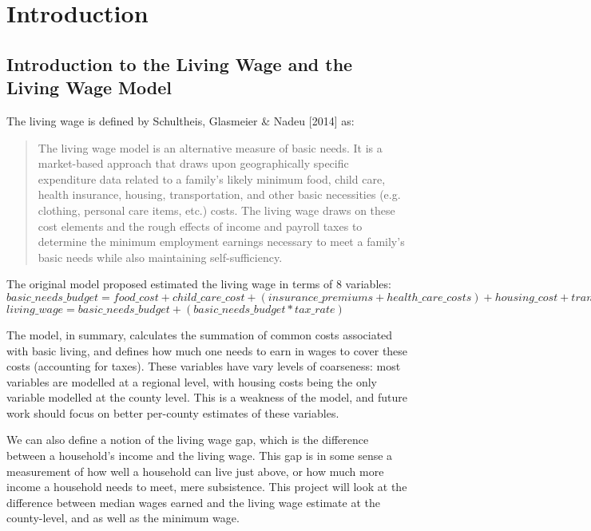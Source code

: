 \chapter{Introduction}\label{ch:introduction}

\section{Introduction to the Living Wage and the Living Wage Model}

The living wage is defined by Schultheis, Glasmeier \& Nadeu [2014]\cite{glasmeier2014} as:

\begin{quote}
The living wage model is an alternative measure of basic needs. It is a market-based approach that draws upon geographically specific expenditure data related to a family's likely minimum food, child care, health insurance, housing, transportation, and other basic necessities (e.g. clothing, personal care items, etc.) costs. The living wage draws on these cost elements and the rough effects of income and payroll taxes to determine the minimum employment earnings necessary to meet a family's basic needs while also maintaining self-sufficiency.
\end{quote}

The original model proposed estimated the living wage in terms of 8 variables:
\newline
\newline
$basic\_needs\_budget = food\_cost + child\_care\_cost + ( insurance\_premiums + health\_care\_costs ) + housing\_cost + transportation\_cost + other\_necessities\_cost$
\newline
\newline
$living\_wage = basic\_needs\_budget + ( basic\_needs\_budget * tax\_rate )$
\newline

The model, in summary, calculates the summation of common costs associated with basic living, and defines how much one needs to earn in wages to cover these costs (accounting for taxes). These variables have vary levels of coarseness: most variables are modelled at a regional level, with housing costs being the only variable modelled at the county level. This is a weakness of the model, and future work should focus on better per-county estimates of these variables.

We can also define a notion of the living wage gap, which is the difference between a household's income and the living wage. This gap is in some sense a measurement of how well a household can live just above, or how much more income a household needs to meet, mere subsistence.  This project will look at the difference between median wages earned and the living wage estimate at the county-level, and as well as the minimum wage.

